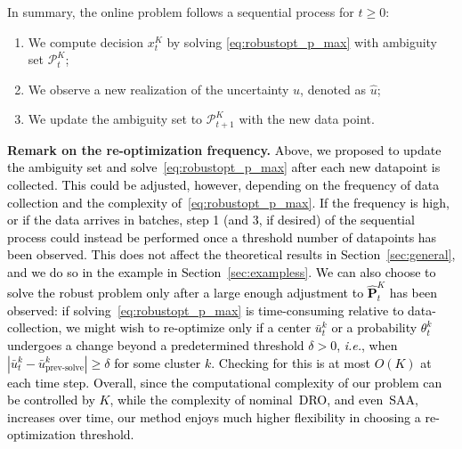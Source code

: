 \documentclass[12pt]{article}
\renewcommand{\paragraph}[1]{\textbf{#1.}\;}
\newcommand{\ie}{{\it i.e.}}
\newcommand{\prob}{{\mathbf P}}
\newcommand{\unc}{u}
\newcommand{\RC}[1]{\textcolor{black}{#1}}
\newcommand{\RC}[1]{\textcolor{blue}{#1}}
\begin{document}
In summary, the online problem follows a sequential process for $t \ge 0$:
\begin{enumerate}
\item We compute decision $x^K_{t}$ by solving \eqref{eq:robustopt_p_max} with ambiguity set $\mathcal{P}^K_{t}$;
\item We observe a new realization of the uncertainty $\unc$, denoted as $\hat{\unc}$;
\item We update the ambiguity set to $\mathcal{P}^K_{t+1}$ with the new data point.
\end{enumerate}
\paragraph{Remark on the re-optimization frequency} \RC{Above, we proposed to update the ambiguity set and solve~\eqref{eq:robustopt_p_max} after each new datapoint is collected. This could be adjusted, however, depending on the frequency of data collection and the complexity of~\eqref{eq:robustopt_p_max}. If the frequency is high, or if the data arrives in batches, step 1 (and 3, if desired) of the sequential process could instead be performed once a threshold number of datapoints has been observed. 
This does not affect the theoretical results in Section~\ref{sec:general}, and we do so in the example in Section~\ref{sec:exampless}.
We can also choose to solve the robust problem only after a large enough adjustment to $\hat{\prob}^K_t$ has been observed: if solving~\eqref{eq:robustopt_p_max} is time-consuming relative to data-collection, we might wish to re-optimize only if a center $\bar{u}^k_t$ or a probability $\theta^k_t$ undergoes a change beyond a predetermined threshold $\delta > 0$, \ie, when $|\bar{u}^k_{t} - \bar{u}^k_{\text{prev-solve}}| \geq \delta$ for some cluster $k$. Checking for this is at most $O(K)$ at each time step.
Overall, since the computational complexity of our problem can be controlled by $K$, while the complexity of nominal~\gls{DRO}, and even~\gls{SAA}, increases over time, our method enjoys much higher flexibility in choosing a re-optimization threshold.
}


\end{document}

